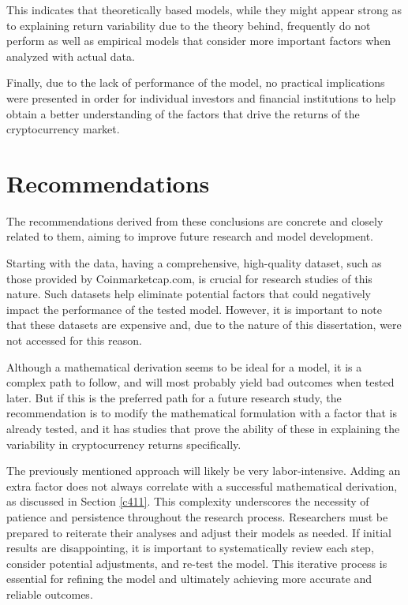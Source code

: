 This indicates that theoretically based models, while they might appear strong as to explaining return variability due to the theory behind, frequently do not perform as well as empirical models that consider more important factors when analyzed with actual data.

Finally, due to the lack of performance of the model, no practical implications were presented in order for individual investors and financial institutions to help obtain a better understanding of the factors that drive the returns of the cryptocurrency market.


\section{Recommendations}
The recommendations derived from these conclusions are concrete and closely related to them, aiming to improve future research and model development.

Starting with the data, having a comprehensive, high-quality dataset, such as those provided by Coinmarketcap.com, is crucial for research studies of this nature. Such datasets help eliminate potential factors that could negatively impact the performance of the tested model. However, it is important to note that these datasets are expensive and, due to the nature of this dissertation, were not accessed for this reason.

Although a mathematical derivation seems to be ideal for a model, it is a complex path to follow, and will most probably yield bad outcomes when tested later. But if this is the preferred path for a future research study, the recommendation is to modify the mathematical formulation with a factor that is already tested, and it has studies that prove the ability of these in explaining the variability in cryptocurrency returns specifically.

The previously mentioned approach will likely be very labor-intensive. Adding an extra factor does not always correlate with a successful mathematical derivation, as discussed in Section \ref{c411}. This complexity underscores the necessity of patience and persistence throughout the research process. Researchers must be prepared to reiterate their analyses and adjust their models as needed. If initial results are disappointing, it is important to systematically review each step, consider potential adjustments, and re-test the model. This iterative process is essential for refining the model and ultimately achieving more accurate and reliable outcomes.

 

